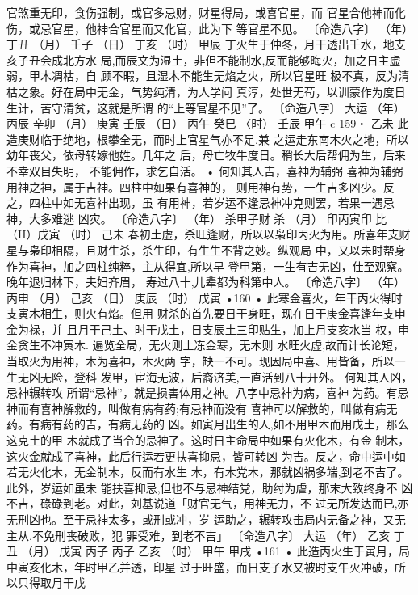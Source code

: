 官煞重无印，食伤强制，或官多忌财，财星得局，或喜官星，而
官星合他神而化伤，或忌官星，他神合官星而又化官，此为下
等官星不见。
〔命造八字〕
（年） 丁丑
（月） 壬子
（日） 丁亥
（时） 甲辰
丁火生于仲冬，月干透出壬水，地支亥子丑会成北方水
局,而辰文为湿土，非但不能制水,反而能够晦火，加之日主虚
弱，甲木凋枯，自 顾不暇，且湿木不能生无焰之火，所以官星旺
极不真，反为清枯之象。好在局中无金，气势纯清，为人学问
真淳，处世无苟，以训蒙作为度日生计，苦守清贫，这就是所谓
的“上等官星不见”了。
〔命造八字〕 大运
（年） 丙辰 辛卯
（月） 庚寅 壬辰
（日） 丙午 癸巳
〈时） 壬辰 甲午
c
159・
乙未
此造庚财临于绝地，根攀全无，而时上官星气亦不足.兼
之运走东南木火之地，所以幼年丧父，依母转嫁他姓。几年之
后，母亡牧牛度日。稍长大后帮佣为生，后来不幸双目失明，
不能佣作，求乞自活。 •
何知其人吉，喜神为辅弼
喜神为辅弼用神之神，属于吉神。四柱中如果有喜神的，
则用神有势，一生吉多凶少。反之，四柱中如无喜神出现，虽
有用神，若岁运不逢忌神冲克则罢，若果一遇忌神，大多难逃
凶灾。
〔命造八字〕
（年） 杀甲子财
杀
（月） 印丙寅印
比
（H）戊寅
（时） 己未
春初土虚，杀旺逢财，所以以枭印丙火为用。所喜年支财
星与枭印相隔，且财生杀，杀生印，有生生不背之妙。纵观局
中，又以未时帮身作为喜神，加之四柱纯粹，主从得宜,所以早
登甲第，一生有吉无凶，仕至观察。晚年退归林下，夫妇齐眉，
寿过八十,儿辈都为科第中人。
〔命造八字〕
（年） 丙申
（月） 己亥
（日） 庚辰
（时） 戊寅
•160 •
此寒金喜火，年干丙火得时支寅木相生，则火有焰。但用
财杀的首先要日干身旺，现在日干庚金喜逢年支申金为禄，并
且月干己土、时干戊土，日支辰土三印贴生，加上月支亥水当
权，申金贪生不冲寅木. 遍览全局，无火则土冻金寒，无木则
水旺火虚,故而计长论短，当取火为用神，木为喜神，木火两
字，缺一不可。现因局中喜、用皆备，所以一生无凶无险，登科
发甲，宦海无波，后裔济美,一直活到八十开外。
何知其人凶，忌神辗转攻
所谓“忌神”，就是损害体用之神。八字中忌神为病，喜神
为药。有忌神而有喜神解救的，叫做有病有药;有忌神而没有
喜神可以解救的，叫做有病无药。有病有药的吉，有病无药的
凶。如寅月出生的人,如不用甲木而用戊土，那么这克土的甲
木就成了当令的忌神了。这时日主命局中如果有火化木，有金
制木，这火金就成了喜神，此后行运若更扶喜抑忌，皆可转凶
为吉。反之，命中运中如若无火化木，无金制木，反而有水生
木，有木党木，那就凶祸多端,到老不吉了。此外，岁运如虽未
能扶喜抑忌,但也不与忌神结党，助纣为虐，那末大致终身不
凶不吉，碌碌到老。对此，刘基说道「财官无气，用神无力，不
过无所发达而已,亦无刑凶也。至于忌神太多，或刑或冲，岁
运助之，辗转攻击局内无备之神，又无主从,不免刑丧破败，犯
罪受难，到老不吉」
〔命造八字〕 大运
（年） 乙亥 丁丑
（月） 戊寅 丙子
丙子 乙亥
（时） 甲午 甲戌
•161 •
此造丙火生于寅月，局中寅亥化木，年时甲乙并透，印星
过于旺盛，而日支子水又被时支午火冲破，所以只得取月干戊
